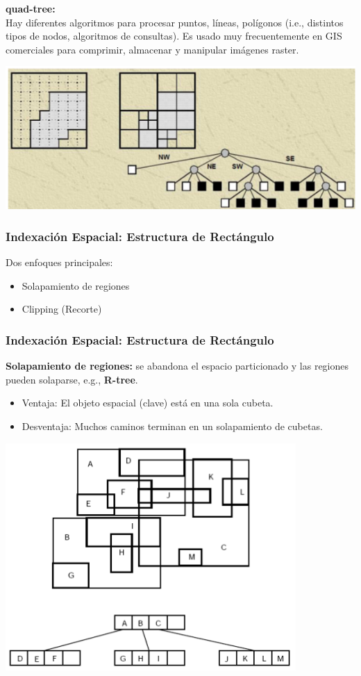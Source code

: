 \documentclass[a4paper,12pt,oneside]{report}
\begin{document}
\noindent \textbf{quad-tree:}\\
Hay diferentes algoritmos para procesar puntos, l\'ineas, pol\'igonos (i.e., distintos tipos de nodos, algoritmos de consultas).
Es usado muy frecuentemente en GIS comerciales para comprimir, almacenar y manipular im\'agenes raster.\\
\begin{center} \includegraphics[scale=0.5]{Imagenes/12.png} \end{center}

\subsubsection*{Indexaci\'on Espacial: Estructura de Rect\'angulo}
Dos enfoques principales:
\begin{itemize}
\item Solapamiento de regiones
\item Clipping (Recorte)
\end{itemize}

\subsubsection*{Indexaci\'on Espacial: Estructura de Rect\'angulo}
\textbf{Solapamiento de regiones:} se abandona el espacio particionado y las regiones pueden solaparse, e.g., \textbf{R-tree}.
\begin{itemize}
\item Ventaja: El objeto espacial (clave) est\'a en una sola cubeta.
\item Desventaja: Muchos caminos terminan en un solapamiento de cubetas.
\end{itemize}
\begin{center}\includegraphics[scale=0.3]{Imagenes/13.png}
\end{center}
\end{document}
